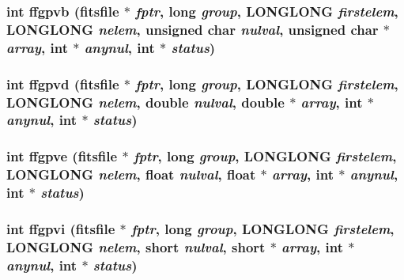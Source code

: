 \subsubsection{\setlength{\rightskip}{0pt plus 5cm}int ffgpvb (\bf{fitsfile} $\ast$ {\em fptr}, long {\em group}, \bf{LONGLONG} {\em firstelem}, \bf{LONGLONG} {\em nelem}, unsigned char {\em nulval}, unsigned char $\ast$ {\em array}, int $\ast$ {\em anynul}, int $\ast$ {\em status})}\label{src_2fitsio_8h_8e74e883f394026b322166c514e89737}


\subsubsection{\setlength{\rightskip}{0pt plus 5cm}int ffgpvd (\bf{fitsfile} $\ast$ {\em fptr}, long {\em group}, \bf{LONGLONG} {\em firstelem}, \bf{LONGLONG} {\em nelem}, double {\em nulval}, double $\ast$ {\em array}, int $\ast$ {\em anynul}, int $\ast$ {\em status})}\label{src_2fitsio_8h_360c62c59f25501d54be60fcc9d188a3}


\subsubsection{\setlength{\rightskip}{0pt plus 5cm}int ffgpve (\bf{fitsfile} $\ast$ {\em fptr}, long {\em group}, \bf{LONGLONG} {\em firstelem}, \bf{LONGLONG} {\em nelem}, float {\em nulval}, float $\ast$ {\em array}, int $\ast$ {\em anynul}, int $\ast$ {\em status})}\label{src_2fitsio_8h_aec726a6192a5cb163c2be7496ba41ff}


\subsubsection{\setlength{\rightskip}{0pt plus 5cm}int ffgpvi (\bf{fitsfile} $\ast$ {\em fptr}, long {\em group}, \bf{LONGLONG} {\em firstelem}, \bf{LONGLONG} {\em nelem}, short {\em nulval}, short $\ast$ {\em array}, int $\ast$ {\em anynul}, int $\ast$ {\em status})}\label{src_2fitsio_8h_5cf08cc899b11b18350ec1def017de1d}


